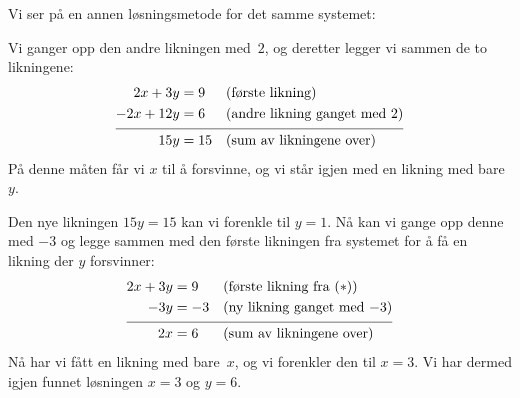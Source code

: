 
Vi ser på en annen løsningsmetode for det samme systemet:

\begin{ex}
Vi ganger opp den andre likningen med~$2$, og deretter legger vi
sammen de to likningene:
\begin{align*}
2x + 3y &= 9   &&\text{(første likning)} \\
-2x + 12y &= 6 &&\text{(andre likning ganget med~$2$)} \\[4pt] \hline
\rule{0pt}{11pt}
15y &= 15      &&\text{(sum av likningene over)}
\end{align*}
På denne måten får vi $x$ til å forsvinne, og vi står igjen med en
likning med bare~$y$.

Den nye likningen $15y = 15$ kan vi forenkle til $y=1$.  Nå kan vi
gange opp denne med $-3$ og legge sammen med den første likningen fra
systemet for å få en likning der $y$ forsvinner:
\begin{align*}
2x + 3y &= 9 &&\text{(første likning fra $(\ast)$)}\\
-3y &= -3    &&\text{(ny likning ganget med $-3$)} \\[4pt] \hline
\rule{0pt}{11pt}
2x &= 6      &&\text{(sum av likningene over)}
\end{align*}
Nå har vi fått en likning med bare~$x$, og vi forenkler den til
$x = 3$.
Vi har dermed igjen funnet løsningen $x = 3$ og $y = 6$.
\end{ex}


